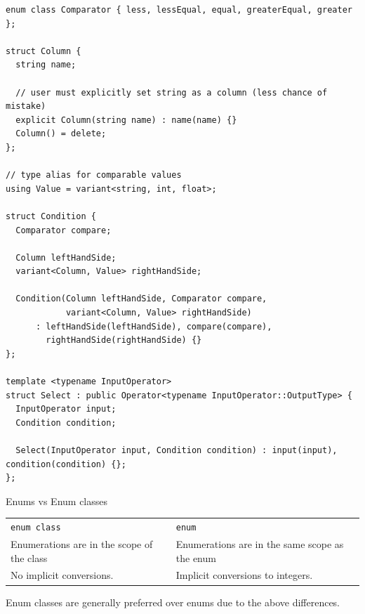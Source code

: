 \begin{verbatim}
enum class Comparator { less, lessEqual, equal, greaterEqual, greater };

struct Column {
  string name;

  // user must explicitly set string as a column (less chance of mistake)
  explicit Column(string name) : name(name) {}
  Column() = delete;
};

// type alias for comparable values
using Value = variant<string, int, float>;

struct Condition {
  Comparator compare;

  Column leftHandSide;
  variant<Column, Value> rightHandSide;

  Condition(Column leftHandSide, Comparator compare,
            variant<Column, Value> rightHandSide)
      : leftHandSide(leftHandSide), compare(compare),
        rightHandSide(rightHandSide) {}
};

template <typename InputOperator> 
struct Select : public Operator<typename InputOperator::OutputType> {
  InputOperator input;
  Condition condition;

  Select(InputOperator input, Condition condition) : input(input), condition(condition) {};
};
\end{verbatim}

\begin{sidenotebox}{Enums vs Enum classes}
  \begin{center}
    \begin{tabular}{p{} p{}}
      \centerline{\texttt{enum class}}  & \centerline{\texttt{enum}}            \\
      Enumerations are in the scope of the class & Enumerations are in the same scope as the enum \\
      No implicit conversions.                   & Implicit conversions to integers.              \\
    \end{tabular}
  \end{center}
  Enum classes are generally preferred over enums due to the above differences.
\end{sidenotebox}

